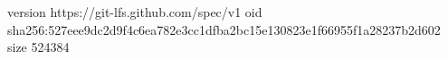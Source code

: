 version https://git-lfs.github.com/spec/v1
oid sha256:527eee9dc2d9f4c6ea782e3cc1dfba2bc15e130823e1f66955f1a28237b2d602
size 524384
